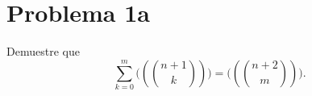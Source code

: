 
\section*{Problema 1a}
Demuestre que
\[
  \sum_{k=0}^{m} \bigl((n+1\choose k)\bigr) = \bigl((n+2\choose m)\bigr).
\]

